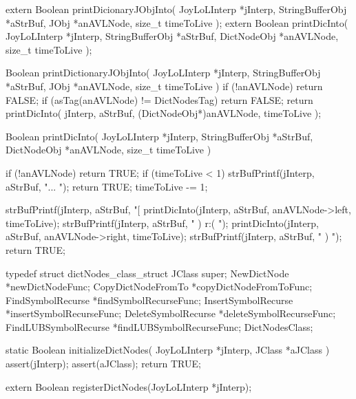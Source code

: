 \startCHeader
extern Boolean printDicionaryJObjInto(
  JoyLoLInterp    *jInterp,
  StringBufferObj *aStrBuf,
  JObj            *anAVLNode,
  size_t           timeToLive
);
extern Boolean printDicInto(
  JoyLoLInterp    *jInterp,
  StringBufferObj *aStrBuf,
  DictNodeObj     *anAVLNode,
  size_t           timeToLive
);
\stopCHeader
{}

\startCCode
Boolean printDictionaryJObjInto(
  JoyLoLInterp    *jInterp,
  StringBufferObj *aStrBuf,
  JObj            *anAVLNode,
  size_t           timeToLive
) {
  if (!anAVLNode) return FALSE;
  if (asTag(anAVLNode) != DictNodesTag) return FALSE;
  return printDicInto(
    jInterp,
    aStrBuf,
    (DictNodeObj*)anAVLNode,
    timeToLive
  );
}

Boolean printDicInto(
  JoyLoLInterp    *jInterp,
  StringBufferObj *aStrBuf,
  DictNodeObj     *anAVLNode,
  size_t           timeToLive
) {
  if (!anAVLNode) return TRUE;
  if (timeToLive < 1) {
    strBufPrintf(jInterp, aStrBuf, "... ");
    return TRUE;
  }
  timeToLive -= 1;
  
  strBufPrintf(jInterp, aStrBuf, "[%
  printDicInto(jInterp, aStrBuf, anAVLNode->left, timeToLive);
  strBufPrintf(jInterp, aStrBuf, " ) r:( ");
  printDicInto(jInterp, aStrBuf, anAVLNode->right, timeToLive);
  strBufPrintf(jInterp, aStrBuf, " ) ");
  return TRUE;
}
\stopCCode

\startTestSuite[registerDictNodes]

\startCHeader
typedef struct dictNodes_class_struct {
  JClass super;
  NewDictNode          *newDictNodeFunc;
  CopyDictNodeFromTo   *copyDictNodeFromToFunc;
  FindSymbolRecurse    *findSymbolRecurseFunc;
  InsertSymbolRecurse  *insertSymbolRecurseFunc;
  DeleteSymbolRecurse  *deleteSymbolRecurseFunc;
  FindLUBSymbolRecurse *findLUBSymbolRecurseFunc;
} DictNodesClass;
\stopCHeader

\startCCode
static Boolean initializeDictNodes(
  JoyLoLInterp *jInterp,
  JClass   *aJClass
) {
  assert(jInterp);
  assert(aJClass);
  return TRUE;
}
\stopCCode

\startCHeader
extern Boolean registerDictNodes(JoyLoLInterp *jInterp);
\stopCHeader
{}

